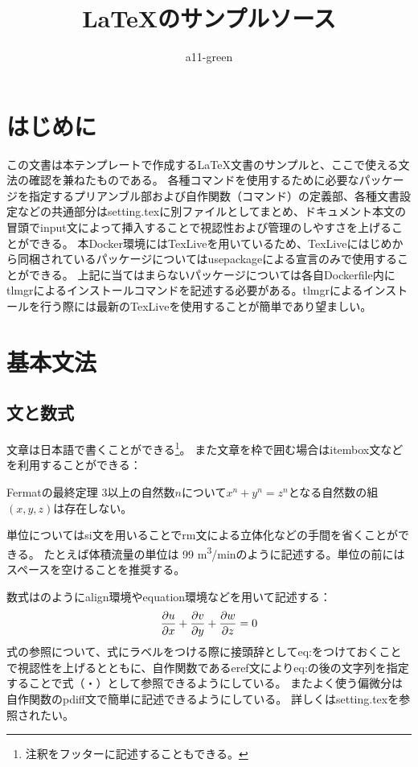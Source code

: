 \documentclass[uplatex]{jsarticle}
\title{\LaTeX のサンプルソース}
\author{a11-green}
\begin{document}
\maketitle
\tableofcontents

\newpage
\section{はじめに}
この文書は本テンプレートで作成する\LaTeX 文書のサンプルと、ここで使える文法の確認を兼ねたものである。
各種コマンドを使用するために必要なパッケージを指定するプリアンブル部および自作関数（コマンド）の定義部、各種文書設定などの共通部分はsetting.texに別ファイルとしてまとめ、ドキュメント本文の冒頭でinput文によって挿入することで視認性および管理のしやすさを上げることができる。
本Docker環境にはTexLiveを用いているため、TexLiveにはじめから同梱されているパッケージについてはusepackageによる宣言のみで使用することができる。
上記に当てはまらないパッケージについては各自Dockerfile内にtlmgrによるインストールコマンドを記述する必要がある。tlmgrによるインストールを行う際には最新のTexLiveを使用することが簡単であり望ましい。

\section{基本文法}
\subsection{文と数式}
文章は日本語で書くことができる\footnote{注釈をフッターに記述することもできる。}。
また文章を枠で囲む場合はitembox文などを利用することができる\cite{itembox}：
\begin{itembox}[l]{Fermatの最終定理}
3以上の自然数$n$について$x^n+y^n=z^n$となる自然数の組$(x,y,z)$は存在しない。
\end{itembox}
単位についてはsi文を用いることでrm文による立体化などの手間を省くことができる。
たとえば体積流量の単位は 99 \si{m^3/min}のように記述する。単位の前にはスペースを空けることを推奨する。
\par
数式はのようにalign環境やequation環境などを用いて記述する：
\begin{align}
	\pdiff{1}{u}{x} + \pdiff{1}{v}{y} + \pdiff{1}{w}{z} = 0
	\label{eq:mass-conservation}
\end{align}
式の参照について、式にラベルをつける際に接頭辞としてeq:をつけておくことで視認性を上げるとともに、自作関数であるeref文によりeq:の後の文字列を指定することで式（・）として参照できるようにしている。
またよく使う偏微分は自作関数のpdiff文で簡単に記述できるようにしている。
詳しくはsetting.texを参照されたい。
\end{document}

